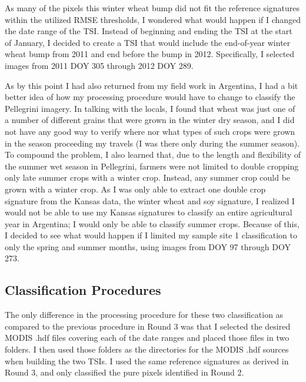 As many of the pixels this winter wheat bump did not fit the reference signatures within the utilized RMSE thresholds, I wondered what would happen if I changed the date range of the TSI. Instead of beginning and ending the TSI at the start of January, I decided to create a TSI that would include the end-of-year winter wheat bump from 2011 and end before the bump in 2012. Specifically, I selected images from 2011 DOY 305 through 2012 DOY 289.


As by this point I had also returned from my field work in Argentina, I had a bit better idea of how my processing procedure would have to change to classify the Pellegrini imagery. In talking with the locals, I found that wheat was just one of a number of different grains that were grown in the winter dry season, and I did not have any good way to verify where nor what types of such crops were grown in the season proceeding my travels (I was there only during the summer season). To compound the problem, I also learned that, due to the length and flexibility of the summer wet season in Pellegrini, farmers were not limited to double cropping only late summer crops with a winter crop. Instead, any summer crop could be grown with a winter crop. As I was only able to extract one double crop signature from the Kansas data, the winter wheat and soy signature, I realized I would not be able to use my Kansas signatures to classify an entire agricultural year in Argentina; I would only be able to classify summer crops. Because of this, I decided to see what would happen if I limited my sample site 1 classification to only the spring and summer months, using images from DOY 97 through DOY 273.

\subsection*{Classification Procedures}

The only difference in the processing procedure for these two classification as compared to the previous procedure in Round 3 was that I selected the desired MODIS .hdf files covering each of the date ranges and placed those files in two folders. I then used those folders as the directories for the MODIS .hdf sources when building the two TSIs. I used the same reference signatures as derived in Round 3, and only classified the pure pixels identified in Round 2.

